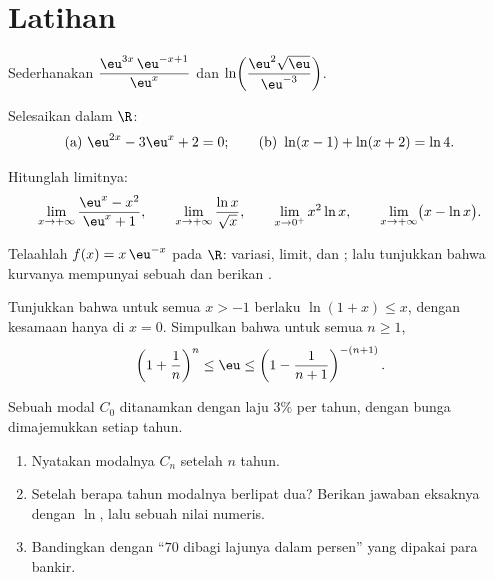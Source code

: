 \section{Latihan}

\begin{exercise}[$\star$]\label{exo:g12:exp:1}
Sederhanakan
$\dfrac{\eu^{3x}\,\eu^{-x+1}}{\eu^{x}}$ dan
$\ln\!\left(\dfrac{\eu^2\sqrt{\eu}}{\eu^{-3}}\right)$.
\end{exercise}

\begin{exercise}[$\star$]\label{exo:g12:exp:2}
Selesaikan dalam $\R$:
\[
\text{(a) } \eu^{2x} - 3\eu^{x} + 2 = 0;
\qquad
\text{(b) } \ln(x - 1) + \ln(x + 2) = \ln 4 .
\]
\end{exercise}

\begin{exercise}[$\star$]\label{exo:g12:exp:3}
Hitunglah limitnya:
\[
\lim_{x\to+\infty} \frac{\eu^x - x^2}{\eu^x + 1}, \qquad
\lim_{x\to+\infty} \frac{\ln x}{\sqrt x}, \qquad
\lim_{x\to0^+} x^2 \ln x, \qquad
\lim_{x\to+\infty} \bigl(x - \ln x\bigr).
\]
\end{exercise}

\begin{exercise}[$\star\star$]\label{exo:g12:exp:4}
Telaahlah  $f(x) = x\,\eu^{-x}$ pada $\R$: variasi, limit, dan ; lalu tunjukkan bahwa kurvanya mempunyai sebuah  dan
berikan .
\end{exercise}

\begin{exercise}[$\star\star$]\label{exo:g12:exp:5}
Tunjukkan bahwa untuk semua $x > -1$ berlaku $\ln(1 + x) \leq x$, dengan
kesamaan hanya di $x = 0$. Simpulkan bahwa untuk semua $n \geq 1$,
\[
\left(1 + \frac{1}{n}\right)^n \leq \eu \leq \left(1 - \frac{1}{n+1}\right)^{-(n+1)} .
\]
\end{exercise}

\begin{exercise}[$\star\star$]\label{exo:g12:exp:6}
Sebuah modal $C_0$ ditanamkan dengan laju $3\%$ per tahun, dengan bunga
dimajemukkan setiap tahun.
\begin{enumerate}
  \item Nyatakan modalnya $C_n$ setelah $n$ tahun.
  \item Setelah berapa tahun modalnya berlipat dua? Berikan jawaban eksaknya
        dengan $\ln$, lalu sebuah nilai numeris.
  \item Bandingkan dengan  ``$70$ dibagi lajunya dalam
        persen'' yang dipakai para bankir.
\end{enumerate}
\end{exercise}

